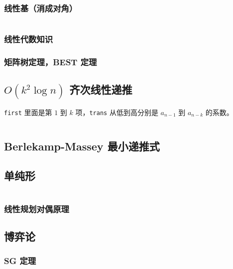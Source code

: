 \documentclass[a4paper, twoside]{article}
\begin{document}
\begin{multicols}{2}
				\subsubsection{线性基（消成对角）}
					\inputminted{cpp}{../src/math/线性基.cpp}

				\subsubsection{线性代数知识}
					
				
				\subsubsection{矩阵树定理，BEST 定理}
					
			
			\subsection{$O(k^2 \log n)$ 齐次线性递推}
				\texttt{first} 里面是第 $1$ 到 $k$ 项，\texttt{trans} 从低到高分别是 $a_{n - 1}$ 到 $a_{n - k}$ 的系数。
				
				\inputminted{cpp}{../src/math/齐次线性递推.cpp}
			
			\subsection{Berlekamp-Massey 最小递推式}
				

			\subsection{单纯形}
				\inputminted{cpp}{../src/math/单纯形.cpp}

				\subsubsection{线性规划对偶原理}
					
			
			\subsection{博弈论}
				\subsubsection{SG 定理}
					


\end{multicols}
\end{document}
